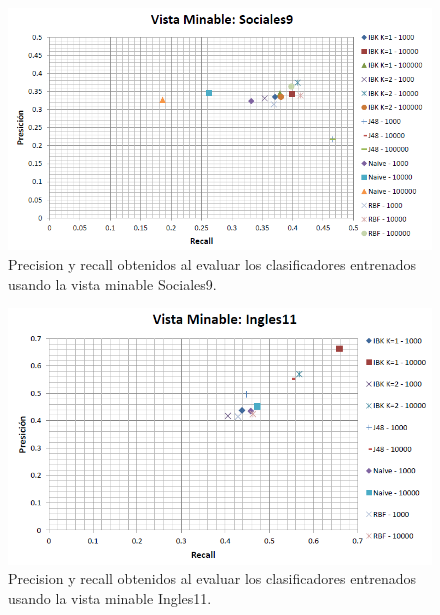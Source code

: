 \documentclass{article}
\begin{document}
\begin{figure}[!htb]
\begin{centering}
\includegraphics[scale=0.7]{sociales9}
\par\end{centering}
\caption{Precision y recall obtenidos al evaluar los clasificadores entrenados usando la vista minable Sociales9.}
\label{fig:figura21}
\end{figure}

\begin{figure}[!htb]
\begin{centering}
\includegraphics[scale=0.7]{ingles11}
\par\end{centering}
\caption{Precision y recall obtenidos al evaluar los clasificadores entrenados usando la vista minable Ingles11.}
\label{fig:figura22}
\end{figure}
\end{document}
